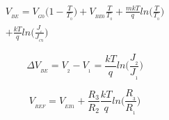 \begin{multline}
  V_{_{BE}} = V_{_{G0}}\Big(1-\frac{T}{T_{_0}}\Big) + V_{_{BE0}}\frac{T}{T_{_0}} + \frac{mkT}{q}ln\Big(\frac{T}{T_{_0}}\Big)\\+ \frac{kT}{q}ln\Big(\frac{J_{_c}}{J_{_{C0}}}\Big)
\end{multline}

\begin{equation}
  {\Delta}V_{_{BE}} = V_{_2} - V_{_1} = \frac{kT}{q}ln\Big(\frac{J_{_2}}{J_{_1}}\Big)
\end{equation}

\begin{equation}
  V_{_{REF}} = V_{_{EB1}} + \frac{R_3}{R_2}\frac{kT}{q}ln\Big(\frac{R_{_3}}{R_{_1}}\Big)
\end{equation}